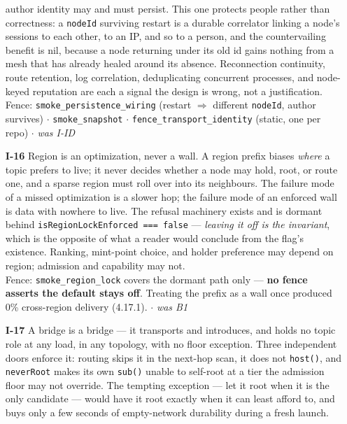 \documentclass[nobib]{tufte-handout}
\begin{document}
\begin{enumerate}
  author identity may and must persist. This one protects people rather
  than correctness: a \texttt{nodeId} surviving restart is a durable
  correlator linking a node's sessions to each other, to an IP, and so
  to a person, and the countervailing benefit is nil, because a node
  returning under its old id gains nothing from a mesh that has already
  healed around its absence. Reconnection continuity, route retention,
  log correlation, deduplicating concurrent processes, and node-keyed
  reputation are each a signal the design is wrong, not a justification.\\
  {\footnotesize\textsf{Fence:} \texttt{smoke\_persistence\_wiring}
  (restart $\Rightarrow$ different \texttt{nodeId}, author survives)
  $\cdot$ \texttt{smoke\_snapshot} $\cdot$
  \texttt{fence\_transport\_identity} (static, one per repo) $\cdot$
  \emph{was I-ID}}
\item[\textbf{I-16}] Region is an optimization, never a wall. A region
  prefix biases \emph{where} a topic prefers to live; it never decides
  whether a node may hold, root, or route one, and a sparse region must
  roll over into its neighbours. The failure mode of a missed
  optimization is a slower hop; the failure mode of an enforced wall is
  data with nowhere to live. The refusal machinery exists and is dormant
  behind \texttt{isRegionLockEnforced === false} --- \emph{leaving it off
  is the invariant}, which is the opposite of what a reader would
  conclude from the flag's existence. Ranking, mint-point choice, and
  holder preference may depend on region; admission and capability may
  not.\\
  {\footnotesize\textsf{Fence:} \texttt{smoke\_region\_lock} covers the
  dormant path only --- \textbf{no fence asserts the default stays
  off}. Treating the prefix as a wall once produced 0\% cross-region
  delivery (4.17.1). $\cdot$ \emph{was B1}}
\item[\textbf{I-17}] A bridge is a bridge --- it transports and
  introduces, and holds no topic role at any load, in any topology, with
  no floor exception. Three independent doors enforce it: routing skips
  it in the next-hop scan, it does not \texttt{host()}, and
  \texttt{neverRoot} makes its own \texttt{sub()} unable to self-root at
  a tier the admission floor may not override. The tempting exception
  --- let it root when it is the only candidate --- would have it root
  exactly when it can least afford to, and buys only a few seconds of
  empty-network durability during a fresh launch.\\

\end{enumerate}
\end{document}
